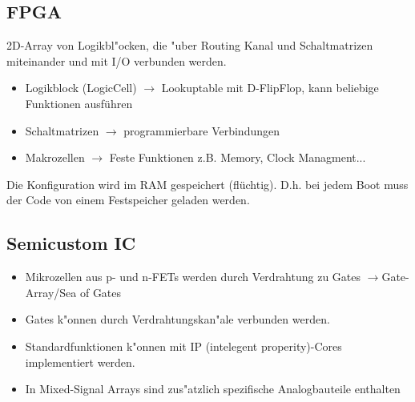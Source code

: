 \begin{scriptsize}
\subsection{FPGA}
2D-Array von Logikbl"ocken, die "uber Routing Kanal und Schaltmatrizen miteinander und mit I/O verbunden werden.
\begin{itemize}
	\setlength{\itemsep}{1pt}
  \setlength{\parskip}{0pt}
  \setlength{\parsep}{0pt}
  
	\item Logikblock (LogicCell) $\rightarrow$ Lookuptable mit D-FlipFlop, kann beliebige Funktionen ausführen
	\item Schaltmatrizen $\rightarrow$ programmierbare Verbindungen
	\item Makrozellen $\rightarrow$ Feste Funktionen z.B. Memory, Clock Managment...
\end{itemize}
Die Konfiguration wird im RAM gespeichert (flüchtig). D.h. bei jedem Boot muss der Code von einem Festspeicher geladen werden.

%
%


\subsection{Semicustom IC}
\begin{itemize}
	\setlength{\itemsep}{1pt}
  \setlength{\parskip}{0pt}
  \setlength{\parsep}{0pt}
  
	\item Mikrozellen aus p- und n-FETs werden durch Verdrahtung zu Gates 			
		$\rightarrow$Gate-Array/Sea of Gates
	\item Gates k"onnen durch Verdrahtungskan"ale verbunden werden.
	\item Standardfunktionen k"onnen mit IP (intelegent properity)-Cores implementiert werden.
	\item In Mixed-Signal Arrays sind zus"atzlich spezifische Analogbauteile enthalten
\end{itemize}	
	

\end{scriptsize}
